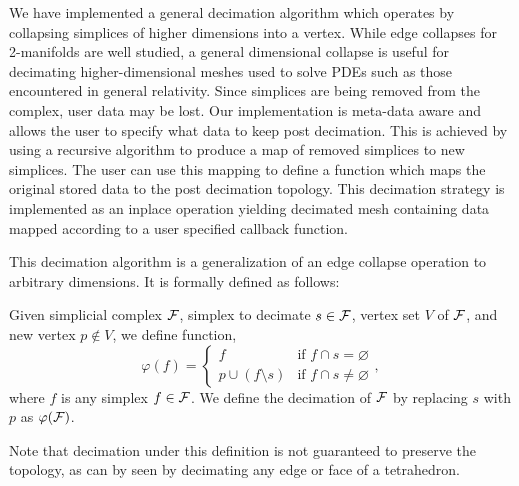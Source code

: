 		\par We have implemented a general decimation algorithm which operates by collapsing simplices of higher dimensions into a vertex.
		While edge collapses for 2-manifolds are well studied, a general dimensional collapse is useful for decimating higher-dimensional meshes used to solve PDEs such as those encountered in general relativity.
		Since simplices are being removed from the complex, user data may be lost.
		Our implementation is meta-data aware and allows the user to specify what data to keep post decimation.
		This is achieved by using a recursive algorithm to produce a map of removed simplices to new simplices.
		The user can use this mapping to define a function which maps the original stored data to the post decimation topology.
		This decimation strategy is implemented as an inplace operation yielding decimated mesh containing data mapped according to a user specified callback function.

		\par This decimation algorithm is a generalization of an edge collapse operation to arbitrary dimensions. It is formally defined as follows:
		\begin{definition}
			Given simplicial complex $\mathcal{F}$, simplex to decimate $s \in \mathcal{F}$, vertex set $V$ of $\mathcal{F}$, and new vertex $p \notin V$, we define function,
			\begin{equation}
			\varphi(f) =
				\begin{cases}
					f 						& \mbox{if } f \cap s = \varnothing\\
					p \cup (f \setminus s) 	& \mbox{if } f \cap s \neq \varnothing
				\end{cases},
			\end{equation}
			where $f$ is any simplex $f \in \mathcal{F}$. We define the decimation of $\mathcal{F}$ by replacing $s$ with $p$ as $\varphi(\mathcal{F})$.
			\label{def:decimation}
		\end{definition}
		Note that decimation under this definition is not guaranteed to preserve the topology, as can by seen by decimating any edge or face of a tetrahedron.

